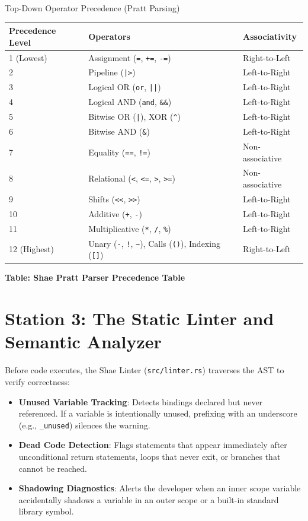 \begin{deepbox}{Top-Down Operator Precedence (Pratt Parsing)}
\begin{center}\vspace{8pt}
\centering
\begin{tabular}{lll}
\toprule
\textbf{Precedence Level} & \textbf{Operators} & \textbf{Associativity} \\
\midrule
1 (Lowest) & Assignment (\texttt{=}, \texttt{+=}, \texttt{-=}) & Right-to-Left \\
2 & Pipeline (\texttt{|>}) & Left-to-Right \\
3 & Logical OR (\texttt{or}, \texttt{||}) & Left-to-Right \\
4 & Logical AND (\texttt{and}, \texttt{\&\&}) & Left-to-Right \\
5 & Bitwise OR (\texttt{|}), XOR (\texttt{\^{}}) & Left-to-Right \\
6 & Bitwise AND (\texttt{\&}) & Left-to-Right \\
7 & Equality (\texttt{==}, \texttt{!=}) & Non-associative \\
8 & Relational (\texttt{<}, \texttt{<=}, \texttt{>}, \texttt{>=}) & Non-associative \\
9 & Shifts (\texttt{<<}, \texttt{>>}) & Left-to-Right \\
10 & Additive (\texttt{+}, \texttt{-}) & Left-to-Right \\
11 & Multiplicative (\texttt{*}, \texttt{/}, \texttt{\%}) & Left-to-Right \\
12 (Highest) & Unary (\texttt{-}, \texttt{!}, \texttt{\~{}}), Calls (\texttt{()}), Indexing (\texttt{[]}) & Right-to-Left \\
\bottomrule
\end{tabular}
\par\vspace{4pt}\small\textbf{Table: Shae Pratt Parser Precedence Table}
\end{center}
\end{deepbox}

\section{Station 3: The Static Linter and Semantic Analyzer}

Before code executes, the Shae Linter (\texttt{src/linter.rs}) traverses the AST to verify correctness:
\begin{itemize}
    \item \textbf{Unused Variable Tracking}: Detects bindings declared but never referenced. If a variable is intentionally unused, prefixing with an underscore (e.g., \texttt{\_unused}) silences the warning.
    \item \textbf{Dead Code Detection}: Flags statements that appear immediately after unconditional return statements, loops that never exit, or branches that cannot be reached.
    \item \textbf{Shadowing Diagnostics}: Alerts the developer when an inner scope variable accidentally shadows a variable in an outer scope or a built-in standard library symbol.
\end{itemize}

